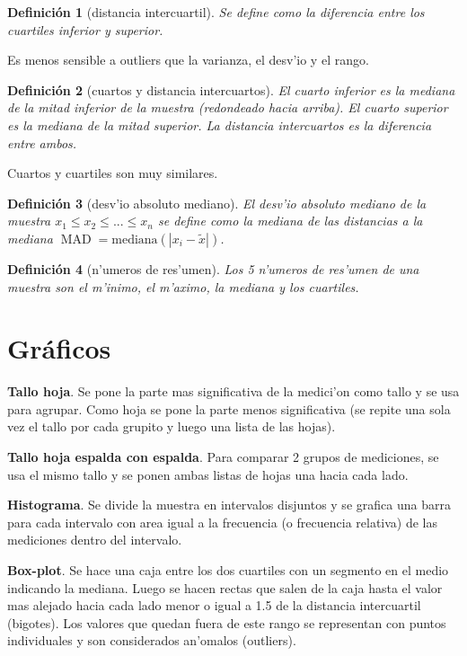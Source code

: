 \documentclass[a4paper,spanish]{article}
\DeclareMathOperator{\MAD}{MAD}
\newtheorem{defi}{Definici\'on}
\begin{document}
\begin{defi}[distancia intercuartil]
Se define como la diferencia entre los cuartiles inferior y superior.
\end{defi}
Es menos sensible a outliers que la varianza, el desv'io y el rango.

\begin{defi}[cuartos y distancia intercuartos]
El \emph{cuarto inferior} es la mediana de la mitad inferior de la muestra
(redondeado hacia arriba). El \emph{cuarto superior} es la mediana de la mitad
superior. La \emph{distancia intercuartos} es la diferencia entre ambos.
\end{defi}
Cuartos y cuartiles son muy similares.

\begin{defi}[desv'io absoluto mediano]
El \emph{desv'io absoluto mediano} de la muestra $x_1 \leq x_2 \leq ... \leq 
x_n$ se define como la mediana de las distancias a la mediana
$\MAD = \mbox{mediana}(|x_i - \tilde{x}|)$.
\end{defi}

\begin{defi}[n'umeros de res'umen]
Los 5 n'umeros de res'umen de una muestra son el m'inimo, el m'aximo, la
mediana y los cuartiles.
\end{defi}

\section{Gr\'aficos}


\textbf{Tallo hoja}. Se pone la parte mas significativa de la medici'on como
tallo y se usa para agrupar. Como hoja se pone la parte menos significativa
(se repite una sola vez el tallo por cada grupito y luego una lista de las
hojas).


\textbf{Tallo hoja espalda con espalda}. Para comparar 2 grupos de mediciones,
se usa el mismo tallo y se ponen ambas listas de hojas una hacia cada lado.


\textbf{Histograma}. Se divide la muestra en intervalos disjuntos y se grafica
una barra para cada intervalo con area igual a la frecuencia (o frecuencia 
relativa) de las mediciones dentro del intervalo.


\textbf{Box-plot}. Se hace una caja entre los dos cuartiles con un segmento en
el medio indicando la mediana. Luego se hacen rectas que salen de la caja hasta
el valor mas alejado hacia cada lado menor o igual a 1.5 de la distancia
intercuartil (bigotes). Los valores que quedan fuera de este rango se
representan con puntos individuales y son considerados an'omalos (outliers).
\end{document}
